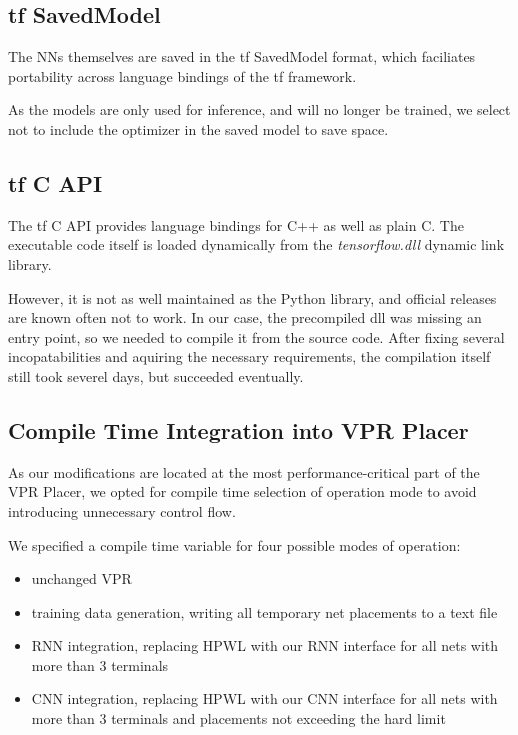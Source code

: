 \subsection{\gls{tf} SavedModel}

The \glspl{NN} themselves are saved in the \gls{tf} SavedModel format, which faciliates portability across language bindings of the \gls{tf} framework. 
	
As the models are only used for inference, and will no longer be trained, we select not to include the optimizer in the saved model to save space.

\subsection{\gls{tf} C API}\label{ch:tf-c-compile}

The \gls{tf} C API provides language bindings for C++ as well as plain C. The executable code itself is loaded dynamically from the \textit{tensorflow.dll} dynamic link library.

However, it is not as well maintained as the Python library, and official releases are known often not to work. In our case, the precompiled dll was missing an entry point, so we needed to compile it from the source code. After fixing several incopatabilities and aquiring the necessary requirements, the compilation itself still took severel days, but succeeded eventually.

\subsection{Compile Time Integration into \gls{VPR} Placer}

As our modifications are located at the most performance-critical part of the \gls{VPR} Placer, we opted for compile time selection of operation mode to avoid introducing unnecessary control flow. 

We specified a compile time variable for four possible modes of operation: 

\begin{itemize}
	\item unchanged \gls{VPR}
	\item training data generation, writing all temporary net placements to a text file
	\item \gls{RNN} integration, replacing \gls{HPWL} with our \gls{RNN} interface for all nets with more than 3 terminals
	\item \gls{CNN} integration, replacing \gls{HPWL} with our \gls{CNN} interface for all nets with more than 3 terminals and placements not exceeding the hard limit
\end{itemize}

